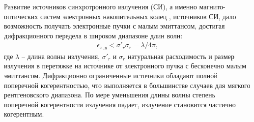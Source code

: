 

Развитие источников синхротронного излучения (СИ), а именно магнито-оптических систем электронных накопительных колец \cite{bartolini_challenges_2021}, \cite{hettel_challenges_2014} источников СИ, дало возможность получать электронные пучки с малым эмиттансом, достигая дифракционного передела в широком диапазоне длин волн:
\begin{align}
	\epsilon_{x, y} < \sigma'_{r}\sigma_{r} = \lambda/4\pi,
	\label{eq:photons_emittance}
\end{align}
где $\lambda$ -- длина волны излучения, $\sigma'_{r}$ и $\sigma_{r}$ натуральная расходимость и размер излучения в перетяжке на источнике от электронного пучка с бесконечно малым эмиттансом. Дифракционно ограниченные источники обладают полной поперечной когерентностью, что выполняется в большинстве случаев для мягкого рентгеновского диапазона. По мере уменьшения длины волны степень поперечной когерентности излучения падает, излучение становится частично когерентным. 

